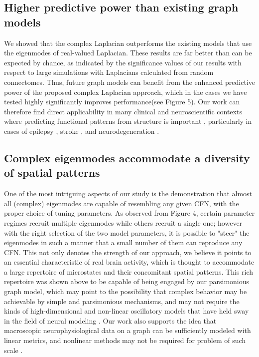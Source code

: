 \documentclass{article}
\begin{document}
\subsection{Higher predictive power than existing graph models}
We showed that the complex Laplacian outperforms the existing models that use the eigenmodes of real-valued Laplacian. These results are far better than can be expected by chance, as indicated by the significance values of our results with respect to large simulations with Laplacians calculated from random connectomes. Thus, future graph models can benefit from the enhanced predictive power of the proposed complex Laplacian approach, which in the cases we have tested highly significantly improves performance(see Figure 5). Our work can therefore find direct applicability in many clinical and neuroscientific contexts where predicting functional patterns from structure is important \cite{jiang_brainnetome_2013, fornito_connectomics_2015}, particularly in cases of epilepsy \cite{coan_frequent_2014}, stroke \cite{Kuceyeski2016, rehme_cerebral_2013}, and neurodegeneration \cite{Zimmermann2018}.

\subsection{Complex eigenmodes accommodate a diversity of spatial patterns}
One of the most intriguing aspects of our study is the demonstration that almost all (complex) eigenmodes are capable of resembling any given CFN, with the proper choice of tuning parameters. As observed from Figure 4, certain parameter regimes recruit multiple eigenmodes while others recruit a single one; however with the right selection of the two model parameters, it is possible to "steer" the eigenmodes in such a manner that a small number of them can reproduce any CFN. This not only denotes the strength of our approach, we believe it points to an essential characteristic of real brain activity, which is thought to accommodate a large repertoire of microstates and their concomitant spatial patterns. This rich repertoire was shown above to be capable of being engaged by our parsimonious graph model, which may point to the possibility that complex behavior may be achievable by simple and parsimonious mechanisms, and may not require the kinds of high-dimensional and non-linear oscillatory models that have held sway in the field of neural modeling \cite{Honey2009, jirsa_derivation_1997}. Our work also supports the idea that macroscopic neurophysiological data on a graph can be sufficiently modeled with linear metrics, and nonlinear methods may not be required for problem of such scale \cite{hlinka_functional_2011, hartman_role_2011}.
\end{document}
